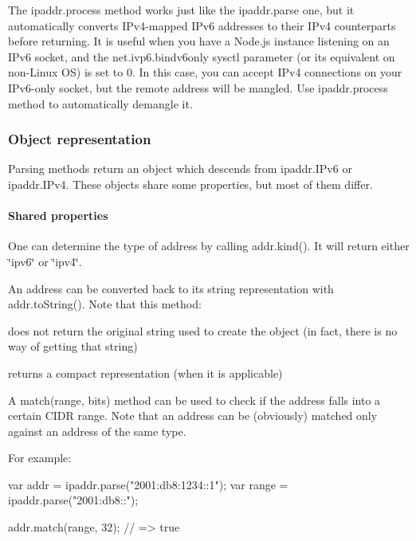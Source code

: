 The {\ttfamily ipaddr.\+process} method works just like the {\ttfamily ipaddr.\+parse} one, but it automatically converts I\+Pv4-\/mapped I\+Pv6 addresses to their I\+Pv4 counterparts before returning. It is useful when you have a Node.\+js instance listening on an I\+Pv6 socket, and the {\ttfamily net.\+ivp6.\+bindv6only} sysctl parameter (or its equivalent on non-\/\+Linux OS) is set to 0. In this case, you can accept I\+Pv4 connections on your I\+Pv6-\/only socket, but the remote address will be mangled. Use {\ttfamily ipaddr.\+process} method to automatically demangle it.

\subsubsection*{Object representation}

Parsing methods return an object which descends from {\ttfamily ipaddr.\+I\+Pv6} or {\ttfamily ipaddr.\+I\+Pv4}. These objects share some properties, but most of them differ.

\paragraph*{Shared properties}

One can determine the type of address by calling {\ttfamily addr.\+kind()}. It will return either {\ttfamily \char`\"{}ipv6\char`\"{}} or {\ttfamily \char`\"{}ipv4\char`\"{}}.

An address can be converted back to its string representation with {\ttfamily addr.\+to\+String()}. Note that this method\+:
\begin{DoxyItemize}
\item does not return the original string used to create the object (in fact, there is no way of getting that string)
\item returns a compact representation (when it is applicable)
\end{DoxyItemize}

A {\ttfamily match(range, bits)} method can be used to check if the address falls into a certain C\+I\+DR range. Note that an address can be (obviously) matched only against an address of the same type.

For example\+:


\begin{DoxyCode}
var addr = ipaddr.parse("2001:db8:1234::1");
var range = ipaddr.parse("2001:db8::");

addr.match(range, 32); // => true
\end{DoxyCode}


